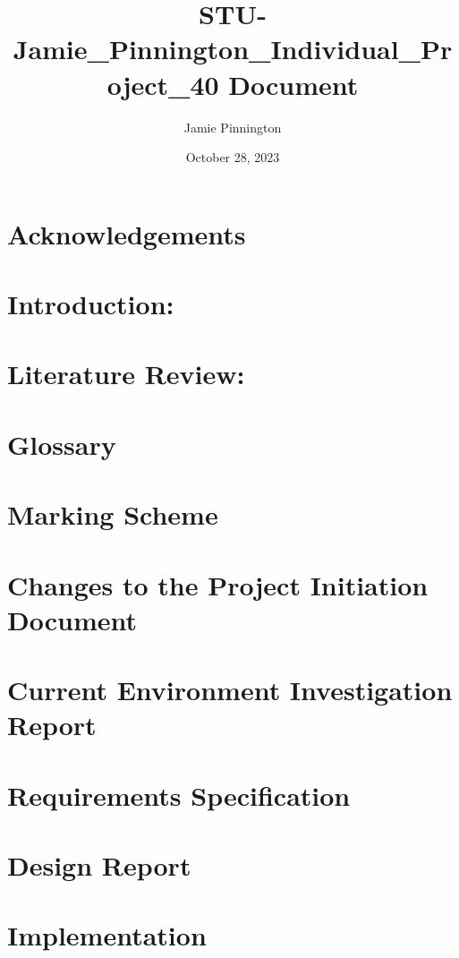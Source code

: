 \documentclass[journal, draftcls]{IEEEtran}
\title{STU-Jamie_Pinnington_Individual_Project_40 Document}
\author{Jamie Pinnington}
\date{October 28, 2023}
\begin{document}


\clearpage %

\begin{abstract}
\end{abstract}

\section*{Acknowledgements}
\clearpage %

\tableofcontents
\clearpage %

\listoffigures
\clearpage %

\listoftables
\clearpage %

\section{Introduction:}

\section{Literature Review:}



%

\section{Glossary}
\section{Marking Scheme}
\section{Changes to the Project Initiation Document}
\section{Current Environment Investigation Report}
\section{Requirements Specification}
\section{Design Report}
\section{Implementation}
\end{document}
